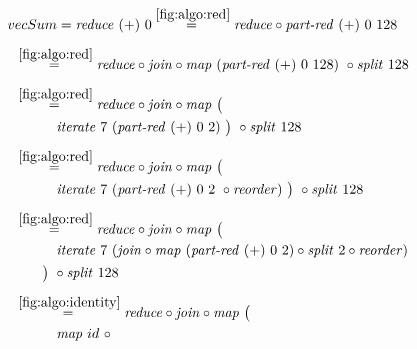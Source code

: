 \begin{align*}
  &\hspace{-1.5em}vecSum = \reduce\ (+)\ 0
%
  \overset{\ref{fig:algo:red}}{=\hspace{.2em}}
      \reduce \circ \partRed\ (+)\ 0\ 128\\[.5em]
%
  &\hspace{-2em}\quad\begin{aligned}
    &\overset{\ref{fig:algo:red}}{=\hspace{.2em}}
      \reduce \circ \join \circ \map\ (\partRed\ (+)\ 0\ 128)\ \circ \splitN\ 128
  \end{aligned}\\[.5em]
%
  &\hspace{-2em}\quad\begin{aligned}
    &\overset{\ref{fig:algo:red}}{=\hspace{.2em}}
      \reduce \circ \join \circ \map\ \big(\\
    &\qquad\quad\iterateN\ 7\ (\partRed\ (+)\ 0\ 2)\ \big)\ \circ \splitN\ 128
  \end{aligned}\\[.5em]
%
  &\hspace{-2em}\quad\begin{aligned}
    &\overset{\ref{fig:algo:red}}{=\hspace{.2em}}
      \reduce \circ \join \circ \map\ \big(\\
    &\qquad\quad\iterateN\ 7\ (\partRed\ (+)\ 0\ 2\ \circ \reorder)\ \big)\ \circ \splitN\ 128
  \end{aligned}\\[.5em]
%
  &\hspace{-2em}\quad\begin{aligned}
    &\overset{\ref{fig:algo:red}}{=\hspace{.2em}}
      \reduce \circ \join \circ \map\ \big(\\
    &\qquad\quad\iterateN\ 7\ (\join \circ \map\ (\partRed\ (+)\ 0\ 2) \circ \splitN\ 2\circ \reorder)\\
    &\qquad\big)\ \circ \splitN\ 128
  \end{aligned}\\[.5em]
%
  &\hspace{-2em}\quad\begin{aligned}
    &\overset{\ref{fig:algo:identity}}{=\hspace{.2em}}
      \reduce \circ \join \circ \map\ \big(\\
    &\qquad\quad\map\ id\ \circ \\

\end{aligned}
\end{align*}
